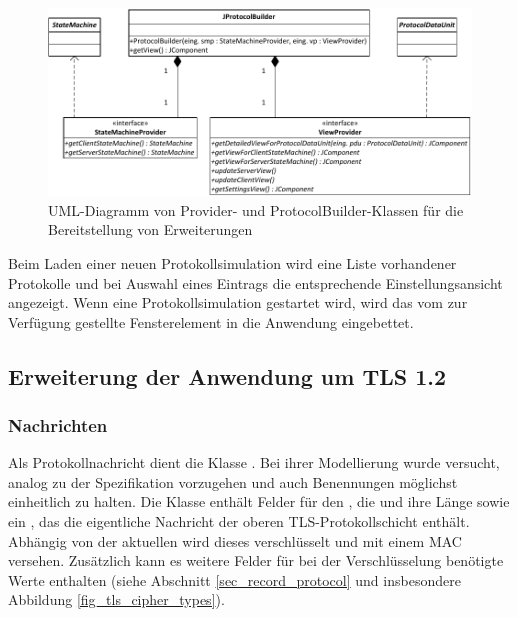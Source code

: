 \begin{figure}
	\centering
	\includegraphics[scale=0.9]{Diagrams/uml/abstract_provider_builder.pdf} %
	\caption{UML-Diagramm von Provider- und ProtocolBuilder-Klassen für die Bereitstellung von Erweiterungen}
	\label{fig_uml_abstract_provider_builder}
\end{figure}

Beim Laden einer neuen Protokollsimulation wird eine Liste vorhandener Protokolle und bei Auswahl eines Eintrags die entsprechende Einstellungsansicht angezeigt. Wenn eine Protokollsimulation gestartet wird, wird das vom  zur Verfügung gestellte Fensterelement in die Anwendung eingebettet.

\subsection{Erweiterung der Anwendung um TLS 1.2}


\subsubsection{Nachrichten}
Als Protokollnachricht dient die Klasse . Bei ihrer Modellierung wurde versucht, analog zu der Spezifikation vorzugehen und auch Benennungen möglichst einheitlich zu halten. Die Klasse enthält Felder für den , die  und ihre Länge sowie ein , das die eigentliche Nachricht der oberen TLS-Protokollschicht enthält.
Abhängig von der aktuellen \ciphersuite{} wird dieses  verschlüsselt und mit einem MAC versehen. Zusätzlich kann es weitere Felder für bei der Verschlüsselung benötigte Werte enthalten (siehe Abschnitt \ref{sec_record_protocol} und insbesondere Abbildung \ref{fig_tls_cipher_types}). 

